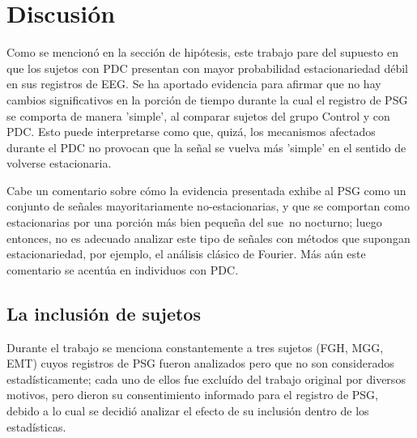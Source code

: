 \documentclass[12pt,a4paper]{mitthesis}
\begin{document}

\section{Discusi\'on}

Como se mencion\'o en la secci\'on de hip\'otesis, este trabajo pare del supuesto en que los
sujetos con PDC presentan con mayor probabilidad estacionariedad d\'ebil en sus registros de EEG.
Se ha aportado evidencia para afirmar que no hay cambios significativos en la porci\'on de tiempo 
durante la cual el registro de PSG se comporta de manera 'simple', al comparar sujetos del grupo Control y con
PDC. Esto puede interpretarse como que, quiz\'a, los mecanismos afectados durante el PDC no 
provocan que la se\~nal se vuelva m\'as 'simple' en el sentido de volverse estacionaria.

Cabe un comentario sobre c\'omo la evidencia presentada exhibe al PSG como un conjunto de se\~nales 
mayoritariamente no-estacionarias, y que se comportan como estacionarias por una porci\'on m\'as
bien peque\~na del sue~no nocturno; luego entonces, no es adecuado analizar este tipo de se\~nales 
con m\'etodos que supongan estacionariedad, por ejemplo, el an\'alisis cl\'asico de Fourier. 
M\'as a\'un este comentario se acent\'ua en individuos con PDC.


\subsection{La inclusi\'on de sujetos}

Durante el trabajo se menciona constantemente a tres sujetos (FGH, MGG, EMT) cuyos registros de PSG 
fueron analizados pero que no son considerados estad\'isticamente; cada uno de ellos fue exclu\'ido 
del trabajo original \cite{VazquezTagle16} por diversos motivos, pero dieron su consentimiento 
informado para el registro de PSG, debido a lo cual se decidi\'o analizar el efecto de su 
inclusi\'on dentro de los estad\'isticas.
\end{document}
